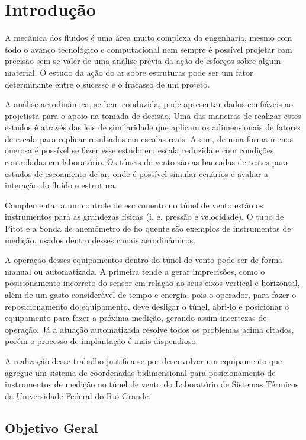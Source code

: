 \chapter{Introdução}\label{ch:introducao}
A mecânica dos fluidos é uma área muito complexa da engenharia, mesmo com todo o avanço tecnológico e computacional 
nem sempre é possível projetar com precisão sem se valer de uma análise prévia da ação de esforços sobre algum material.
O estudo da ação do ar sobre estruturas pode ser um fator determinante entre o sucesso e o fracasso de um projeto.

A análise aerodinâmica, se bem conduzida, pode apresentar dados confiáveis ao projetista para o apoio na tomada 
de decisão. Uma das maneiras de realizar estes estudos é através das leis de similaridade que aplicam os adimensionais 
de fatores de escala para replicar resultados em escalas reais. Assim, de uma forma menos onerosa é possível se fazer 
esse estudo em escala reduzida e com condições controladas em laboratório. Os túneis de vento são as bancadas de testes 
para estudos de escoamento de ar, onde é possível simular cenários e avaliar a interação do fluido e estrutura.

Complementar a um controle de escoamento no túnel de vento estão os instrumentos para as grandezas físicas 
(i. e. pressão e velocidade). O tubo de Pitot e a Sonda de anemômetro de fio quente são exemplos de instrumentos 
de medição, usados dentro desses canais aerodinâmicos.

A operação desses equipamentos dentro do túnel de vento pode ser de forma manual ou automatizada. A primeira tende a 
gerar imprecisões, como o posicionamento incorreto do sensor em relação ao seus eixos vertical e horizontal, além de 
um gasto considerável de tempo e energia, pois o operador, para fazer o reposicionamento do equipamento, deve desligar 
o túnel, abri-lo e posicionar o equipamento para fazer a próxima medição, gerando assim incertezas de operação. Já a 
atuação automatizada resolve todos os problemas acima citados, porém o processo de implantação é mais dispendioso. 

A realização desse trabalho justifica-se por desenvolver um equipamento que agregue um sistema de coordenadas 
bidimensional para posicionamento de instrumentos de medição no túnel de vento do Laboratório de Sistemas Térmicos  
da Universidade Federal do Rio Grande.

\section{Objetivo Geral}\label{sec:objetivogeral}

